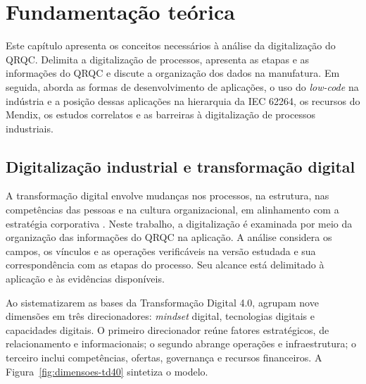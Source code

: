 \chapter{Fundamentação teórica}
\label{cap:FundamentacaoTeorica}

Este capítulo apresenta os conceitos necessários à análise da digitalização do QRQC. Delimita a digitalização de processos, apresenta as etapas e as informações do QRQC e discute a organização dos dados na manufatura. Em seguida, aborda as formas de desenvolvimento de aplicações, o uso do \textit{low-code} na indústria e a posição dessas aplicações na hierarquia da IEC 62264, os recursos do Mendix, os estudos correlatos e as barreiras à digitalização de processos industriais.

\section{Digitalização industrial e transformação digital}
\label{sec:td}

A transformação digital envolve mudanças nos processos, na estrutura, nas competências das pessoas e na cultura organizacional, em alinhamento com a estratégia corporativa \cite[p.~57]{murici2022}. Neste trabalho, a digitalização é examinada por meio da organização das informações do QRQC na aplicação. A análise considera os campos, os vínculos e as operações verificáveis na versão estudada e sua correspondência com as etapas do processo. Seu alcance está delimitado à aplicação e às evidências disponíveis.

Ao sistematizarem as bases da Transformação Digital 4.0,  agrupam nove dimensões em três direcionadores: \textit{mindset} digital, tecnologias digitais e capacidades digitais. O primeiro direcionador reúne fatores estratégicos, de relacionamento e informacionais; o segundo abrange operações e infraestrutura; o terceiro inclui competências, ofertas, governança e recursos financeiros. A Figura~\ref{fig:dimensoes-td40} sintetiza o modelo.

